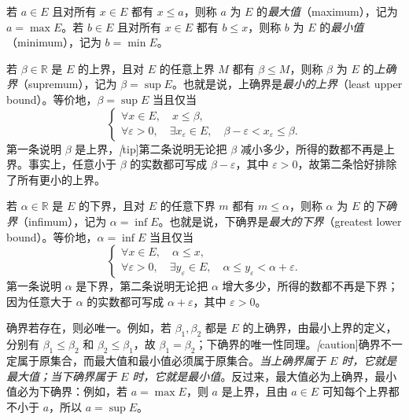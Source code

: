 \begin{definition}
\label{def:maximum-and-minimum}
若 $a\in E$ 且对所有 $x\in E$ 都有 $x\leq a$，则称 $a$ 为 $E$ 的\emph{最大值}（maximum），记为 $a=\max E$。若 $b\in E$ 且对所有 $x\in E$ 都有 $b\leq x$，则称 $b$ 为 $E$ 的\emph{最小值}（minimum），记为 $b=\min E$。
\end{definition}

\begin{definition}
\label{def:supremum}
若 $\beta\in\mathbb{R}$ 是 $E$ 的上界，且对 $E$ 的任意上界 $M$ 都有 $\beta\leq M$，则称 $\beta$ 为 $E$ 的\emph{上确界}（supremum），记为 $\beta=\sup E$。也就是说，上确界是\emph{最小的上界}（least upper bound）。等价地，$\beta=\sup E$ 当且仅当
\[
    \begin{cases}
        \forall x\in E,\quad x\leq\beta,\\
        \forall\varepsilon>0,\quad \exists x_{\varepsilon}\in E,\quad
        \beta-\varepsilon<x_{\varepsilon}\leq\beta.
    \end{cases}
\]
第一条说明 $\beta$ 是上界，\emph[tip]{第二条说明无论把 $\beta$ 减小多少，所得的数都不再是上界}。事实上，任意小于 $\beta$ 的实数都可写成 $\beta-\varepsilon$，其中 $\varepsilon>0$，故第二条恰好排除了所有更小的上界。
\end{definition}

\begin{definition}
\label{def:infimum}
若 $\alpha\in\mathbb{R}$ 是 $E$ 的下界，且对 $E$ 的任意下界 $m$ 都有 $m\leq\alpha$，则称 $\alpha$ 为 $E$ 的\emph{下确界}（infimum），记为 $\alpha=\inf E$。也就是说，下确界是\emph{最大的下界}（greatest lower bound）。等价地，$\alpha=\inf E$ 当且仅当
\[
    \begin{cases}
        \forall x\in E,\quad \alpha\leq x,\\
        \forall\varepsilon>0,\quad \exists y_{\varepsilon}\in E,\quad
        \alpha\leq y_{\varepsilon}<\alpha+\varepsilon.
    \end{cases}
\]
第一条说明 $\alpha$ 是下界，第二条说明无论把 $\alpha$ 增大多少，所得的数都不再是下界；因为任意大于 $\alpha$ 的实数都可写成 $\alpha+\varepsilon$，其中 $\varepsilon>0$。
\end{definition}

确界若存在，则必唯一。例如，若 $\beta_1,\beta_2$ 都是 $E$ 的上确界，由最小上界的定义，分别有 $\beta_1\leq\beta_2$ 和 $\beta_2\leq\beta_1$，故 $\beta_1=\beta_2$；下确界的唯一性同理。\emph[caution]{确界不一定属于原集合，而最大值和最小值必须属于原集合。}\emph{当上确界属于 $E$ 时，它就是最大值；当下确界属于 $E$ 时，它就是最小值}。反过来，最大值必为上确界，最小值必为下确界：例如，若 $a=\max E$，则 $a$ 是上界，且由 $a\in E$ 可知每个上界都不小于 $a$，所以 $a=\sup E$。

